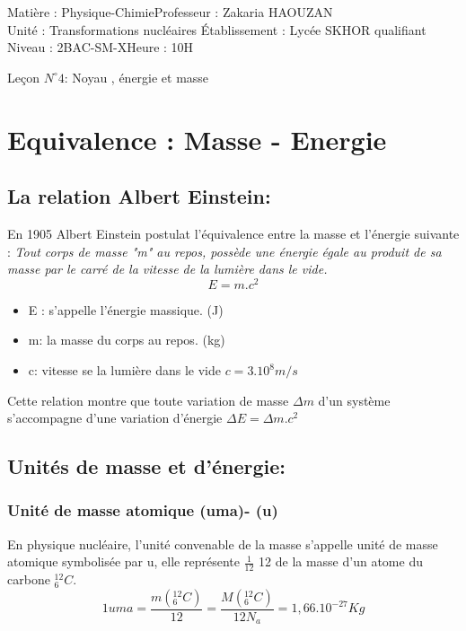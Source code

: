 \documentclass[12pt]{article}
\author{Zakaria HAOUZAN}
\date{\today}
\newcommand\headerMe[2]{\noindent{}#1\hfill#2}
\begin{document}
\headerMe{Matière : Physique-Chimie}{Professeur : Zakaria HAOUZAN}\\
\headerMe{Unité : Transformations nucléaires }{Établissement : Lycée SKHOR qualifiant}\\
\headerMe{Niveau : 2BAC-SM-X}{Heure : 10H}\\

\begin{center}

    \Large{Leçon $N^{\circ} 4 $: \color{red}Noyau , énergie et masse }
\end{center}



\section{ Equivalence : Masse - Energie  }

\subsection{La relation Albert Einstein:  }
En 1905 Albert Einstein postulat l'équivalence entre la masse et l'énergie suivante :
\emph{Tout corps de masse "m" au repos, possède une énergie égale au produit de sa masse par le carré de la vitesse
de la lumière  dans le vide.}$$E = m.c^2$$
\begin{itemize}
	\item E : s'appelle l'énergie massique. (J)
	\item m: la masse du corps au repos. (kg)
	\item c: vitesse se la lumière dans le vide $c=3.10^8m/s$
	\end{itemize}
	Cette relation montre que toute variation de masse $\Delta{m}$ d'un système s'accompagne d'une variation d'énergie
	$\Delta{E}=\Delta{m}.c^2$
	\subsection{Unités de masse et d'énergie: }
	\subsubsection{ Unité de masse atomique (uma)- (u)}
En physique nucléaire, l'unité convenable de la masse s'appelle unité de masse
atomique symbolisée par u, elle représente $\frac{1}{12}$ 12
de la masse d'un atome du carbone $_6^{12}C$.
$$1uma = \frac{m(_6^{12}C)}{12} = \frac{M(_6^{12}C)}{12N_a} = 1,66.10^{-27}Kg$$
\end{document}

